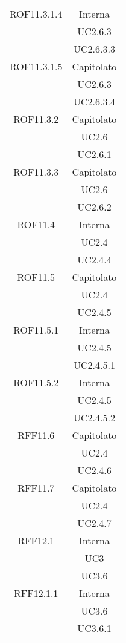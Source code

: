\begin{longtable}{|c|c|}
\midrule
ROF11.3.1.4
& Interna\\
& UC2.6.3\\
& UC2.6.3.3
\\

\midrule
ROF11.3.1.5
& Capitolato\\
& UC2.6.3\\
& UC2.6.3.4
\\

\midrule
ROF11.3.2
& Capitolato\\
& UC2.6\\
& UC2.6.1
\\

\midrule
ROF11.3.3
& Capitolato\\
& UC2.6\\
& UC2.6.2
\\

\midrule
ROF11.4
& Interna\\
& UC2.4\\
& UC2.4.4
\\

\midrule
ROF11.5
& Capitolato\\
& UC2.4\\
& UC2.4.5
\\

\midrule
ROF11.5.1
& Interna\\
& UC2.4.5\\
& UC2.4.5.1
\\

\midrule
ROF11.5.2
& Interna\\
& UC2.4.5\\
& UC2.4.5.2
\\

\midrule
RFF11.6
& Capitolato\\
& UC2.4\\
& UC2.4.6
\\

\midrule
RFF11.7
& Capitolato\\
& UC2.4\\
& UC2.4.7
\\



\midrule
RFF12.1
& Interna\\
& UC3\\
& UC3.6\\

\midrule
RFF12.1.1
& Interna\\
& UC3.6\\
& UC3.6.1\\


\end{longtable}
